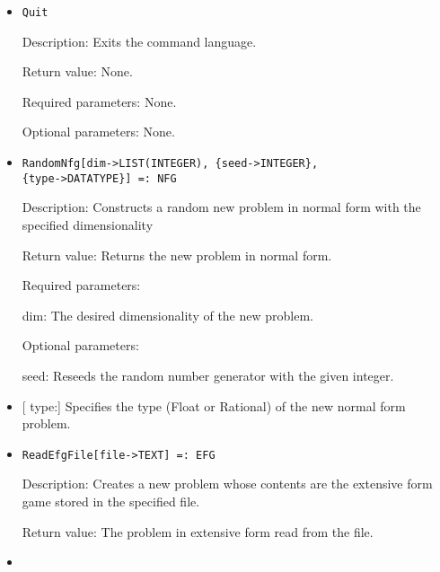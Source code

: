 \begin{itemize}
\ed
\ed

\item

\protect \large \begin{verbatim}
Quit
\end{verbatim}\normalsize

\bd

\item
[Description:] Exits the command language.
\item
[Return value:] None.
\item
[Required parameters:] None.
\item
[Optional parameters:] None.
\ed

\item

\protect \large \begin{verbatim}
RandomNfg[dim->LIST(INTEGER), {seed->INTEGER}, 
{type->DATATYPE}] =: NFG
\end{verbatim}\normalsize

\bd
\item
[Description:] Constructs a random new problem in normal form with the 
specified dimensionality
\item
[Return value:] Returns the new problem in normal form.
\item
[Required parameters:]\hfil\null
	
\bd
\item
[ dim:] The desired dimensionality of the new problem.
\ed

\item
[Optional parameters:]\hfil\null
	
\bd
\item
[ seed:] Reseeds the random number generator with the given integer.
\item

[ type:] Specifies the type (Float or Rational) of the new normal 
form problem.
\ed
\ed

\item
\protect \large \begin{verbatim}
ReadEfgFile[file->TEXT] =: EFG
\end{verbatim}\normalsize

\bd
\item
[Description:] Creates a new problem whose contents are the extensive 
form game stored in the specified file.
\item
[Return value:] The problem in extensive form read from the file.
\item


\end{itemize}
